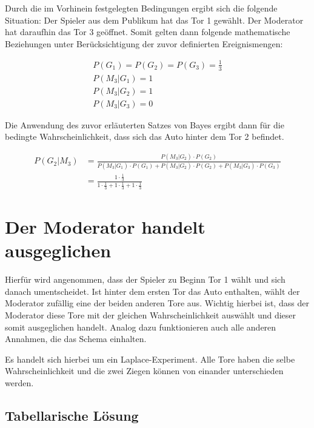 Durch die im Vorhinein festgelegten Bedingungen ergibt sich die folgende Situation:
Der Spieler aus dem Publikum hat das Tor 1 gewählt. Der Moderator hat daraufhin das Tor 3 geöffnet.
Somit gelten dann folgende mathematische Beziehungen unter Berücksichtigung der zuvor definierten Ereignismengen:

\begin{equation} \label{eq1}
\begin{split}
    P(G_1) = P(G_2) = P(G_3) = \frac{1}{3} \\
    P(M_3 | G_1) = 1 \\
    P(M_3 | G_2) = 1 \\ 
    P(M_3 | G_3) = 0
\end{split}
\end{equation}

Die Anwendung des zuvor erläuterten Satzes von Bayes ergibt dann für die bedingte Wahrscheinlichkeit, dass sich das Auto hinter dem Tor 2 befindet.

\begin{equation}
\begin{split}
    P(G_2 | M_3) & = \frac{P(M_3 | G_2) \cdot P(G_2)}{P(M_3 | G_1) \cdot P(G_1) +
    P(M_3 | G_2) \cdot P(G_2) + P(M_3 | G_3) \cdot P(G_3)} \\
    & = \frac{1 \cdot \frac{1}{3}}{1 \cdot \frac{1}{3} + 1 \cdot \frac{1}{3} + 1 \cdot \frac{1}{3}}
\end{split}
\end{equation}

\newpage
\section{Der Moderator handelt ausgeglichen}

Hierfür wird angenommen, dass der Spieler zu Beginn Tor 1 wählt und sich danach umentscheidet. Ist hinter dem ersten Tor das Auto enthalten, wählt der Moderator zufällig eine der beiden anderen Tore aus.
Wichtig hierbei ist, dass der Moderator diese Tore mit der gleichen Wahrscheinlichkeit auswählt und dieser somit ausgeglichen handelt. Analog dazu funktionieren auch alle anderen Annahmen,
die das Schema einhalten.

Es handelt sich hierbei um ein Laplace-Experiment. Alle Tore haben die selbe Wahrscheinlichkeit und die zwei Ziegen können von einander unterschieden werden.

\subsection{Tabellarische Lösung}

